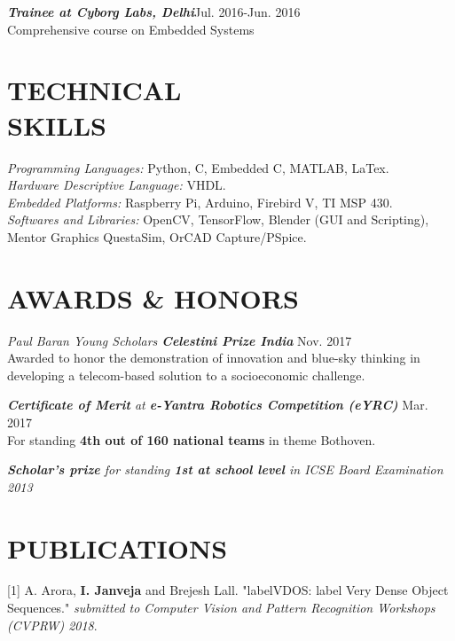 \documentclass[margin, 10pt]{res} %
\begin{document}
\begin{resume}
{\sl \bf{Trainee at Cyborg Labs, Delhi}}\hfill Jul. 2016-Jun. 2016\\
Comprehensive course on Embedded Systems


\section{TECHNICAL \\ SKILLS} 

{\sl Programming Languages:} Python, C, Embedded C, MATLAB, LaTex. \\
{\sl Hardware Descriptive Language:} VHDL. \\
{\sl Embedded Platforms:} Raspberry Pi, Arduino, Firebird V, TI MSP 430. \\
{\sl Softwares and Libraries:} OpenCV, TensorFlow, Blender (GUI and Scripting), Mentor Graphics QuestaSim, OrCAD Capture/PSpice. 



\section{AWARDS \& HONORS}
{\sl Paul Baran Young Scholars \bf{Celestini Prize India}} \hfill Nov. 2017 \\Awarded to honor the demonstration of innovation and blue-sky thinking in developing a telecom-based solution to a socioeconomic challenge. 

{\sl {\bf Certificate of Merit} at {\bf e-Yantra Robotics Competition (eYRC)}} \hfill Mar. 2017\\ For standing {\bf 4th out of 160 national teams} in theme Bothoven.

{\sl {\bf Scholar's prize} for standing {\bf 1st at school level} in ICSE Board Examination \hfill 2013}

\newpage
\section{PUBLICATIONS}
[1] A. Arora, {\bf I. Janveja} and Brejesh Lall. "labelVDOS: label Very Dense Object Sequences." \textit{submitted to Computer Vision and Pattern Recognition Workshops (CVPRW) 2018}.


\end{resume}
\end{document}
